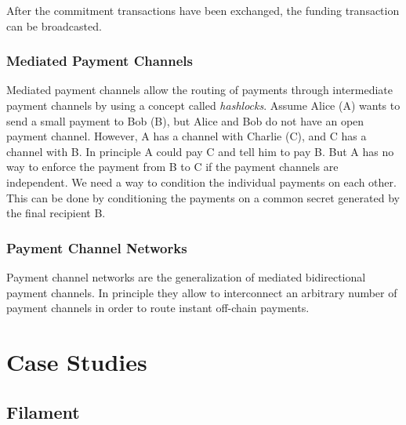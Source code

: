 After the commitment transactions have been exchanged, the funding transaction can be broadcasted. 

\subsubsection{Mediated Payment Channels}

Mediated payment channels allow the routing of payments through intermediate payment channels by using a concept called \emph{hashlocks}. Assume Alice (A) wants to send a small payment to Bob (B), but Alice and Bob do not have an open payment channel. However, A has a channel with Charlie (C), and C has a channel with B. In principle A could pay C and tell him to pay B. But A has no way to enforce the payment from B to C if the payment channels are independent. We need a way to condition the individual payments on each other. This can be done by conditioning the payments on a common secret generated by the final recipient B.

\subsubsection{Payment Channel Networks}

Payment channel networks are the generalization of mediated bidirectional payment channels. In principle they allow to interconnect an arbitrary number of payment channels in order to route instant off-chain payments. 


\section{Case Studies}

\subsection{Filament}

